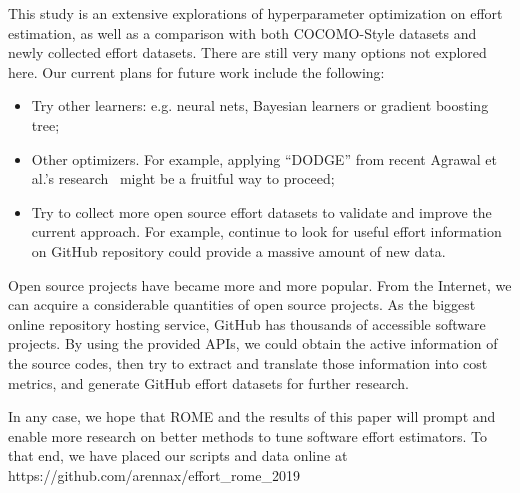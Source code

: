 \documentclass[sigconf,review]{acmart}
\newcommand{\bi}{\begin{itemize}}
\newcommand{\ei}{\end{itemize}}
\begin{document}
This study is an extensive explorations of hyperparameter optimization on effort estimation, as well as a comparison with both COCOMO-Style datasets and newly collected effort datasets. There are still very many
options not explored here. Our current
plans for future work include the following:

\bi
\item Try other learners:
e.g. neural nets, Bayesian learners or gradient boosting tree;
\item Other optimizers. For example,
applying ``DODGE'' from recent Agrawal et al.'s research~\cite{agrawal2019dodge} might be a fruitful way to proceed;
\item Try to collect more open source effort datasets to validate and improve the current approach. For example, continue to look for useful effort information on GitHub repository could provide a massive amount of new data.
\ei
Open source projects have became more and more popular. From the Internet, we can acquire a considerable quantities of open source projects. As the biggest online repository hosting service, GitHub has thousands of accessible software projects. By using the provided APIs, we could obtain the active information of the source codes, then try to extract and translate those information into cost metrics, and generate GitHub effort datasets for further research.

In any case, we  hope  that ROME  and the results of this paper will  prompt  and  enable
more research on better methods to tune software effort
estimators.
To that end, we have placed our scripts and data online at https://github.com/arennax/effort\_rome\_2019



\end{document}
